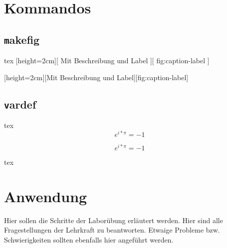 \newpage
\section{Kommandos}\label{sec:Kommandos}
\subsection{\texttt makefig}

\begin{listing}
\begin{code}{tex}
[height=2cm][
    Mit Beschreibung und Label  %
][
    fig:caption-label           %
]
\end{code}
\caption{\texttt makefig}
\label{lst:makefig}
\end{listing}
[height=2cm][Mit Beschreibung und Label][fig:caption-label]

\subsection{\texttt vardef}
\begin{listing}
\begin{code}{tex}
$$e^{i*\pi} = -1$$
\end{code}

$$e^{i*\pi} = -1$$

\begin{code}[firstnumber=last]{tex}
\begin{vardef}
\end{vardef}
\end{code}

\begin{vardef}
\end{vardef}

\caption{\texttt vardef}
\label{lst:vardef}
\end{listing}

\newpage
\section{Anwendung}\label{sec:Anwendung}
Hier sollen die Schritte der Laborübung erläutert werden. Hier sind alle Fragestellungen der Lehrkraft zu beantworten. Etwaige Probleme bzw. Schwierigkeiten sollten ebenfalls hier angeführt werden.

